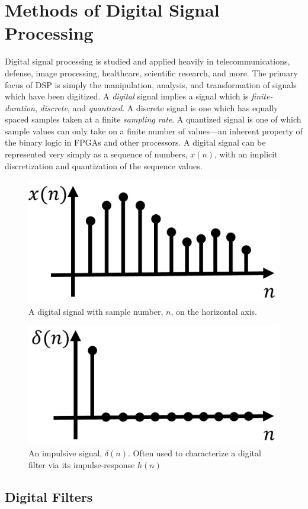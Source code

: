 \documentclass[reprint,amsmath,amssymb]{revtex4-2}
\begin{document}
\section{Methods of Digital Signal Processing}

Digital signal processing is studied and applied heavily in telecommunications, defense, image processing, healthcare, scientific research, and more. The primary focus of DSP is simply the manipulation, analysis, and transformation of signals which have been digitized. A \textit{digital} signal implies a signal which is \textit{finite-duration}, \textit{discrete}, and \textit{quantized}. A discrete signal is one which has equally spaced samples taken at a finite \textit{sampling rate}. A quantized signal is one of which sample values can only take on a finite number of values---an inherent property of the binary logic in FPGAs and other processors. A digital signal can be represented very simply as a sequence of numbers, $x(n)$, with an implicit discretization and quantization of the sequence values.

\begin{figure}
    \centering
    \includegraphics[width=0.6\linewidth]{figs/digital_signal.png}
    \caption{A digital signal with sample number, $n$, on the horizontal axis.}
    \label{fig:1}
\end{figure}
\begin{figure}
    \centering
    \includegraphics[width=0.6\linewidth]{figs/impulse.png}
    \caption{An impulsive signal, $\delta(n)$. Often used to characterize a digital filter via its impulse-response $h(n)$}
    \label{fig:2}
\end{figure}

\subsection{Digital Filters}
\end{document}
